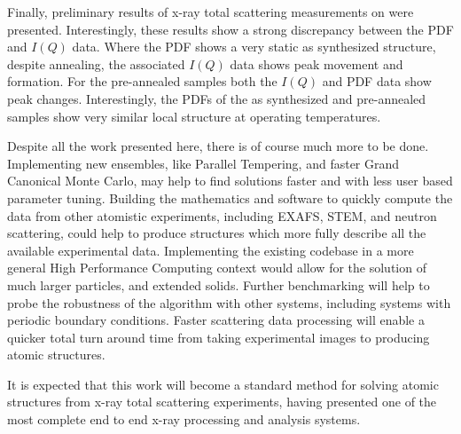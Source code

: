 Finally, preliminary results of x-ray total scattering measurements on  were presented.
Interestingly, these results show a strong discrepancy between the PDF and $I(Q)$ data.
Where the PDF shows a very static as synthesized structure, despite annealing, the associated $I(Q)$ data shows peak movement and formation.
For the pre-annealed samples both the $I(Q)$ and PDF data show peak changes.
Interestingly, the PDFs of the as synthesized and pre-annealed samples show very similar local structure at operating temperatures.

Despite all the work presented here, there is of course much more to be done.
Implementing new ensembles, like Parallel Tempering, and faster Grand Canonical Monte Carlo, may help to find solutions faster and with less user based parameter tuning.
Building the mathematics and software to quickly compute the data from other atomistic experiments, including EXAFS, STEM, and neutron scattering, could help to produce structures which more fully describe all the available experimental data.
Implementing the existing codebase in a more general High Performance Computing context would allow for the solution of much larger particles, and extended solids.
Further benchmarking will help to probe the robustness of the algorithm with other systems, including systems with periodic boundary conditions.
Faster scattering data processing will enable a quicker total turn around time from taking experimental images to producing atomic structures.

It is expected that this work will become a standard method for solving atomic structures from x-ray total scattering experiments, having presented one of the most complete end to end x-ray processing and analysis systems.